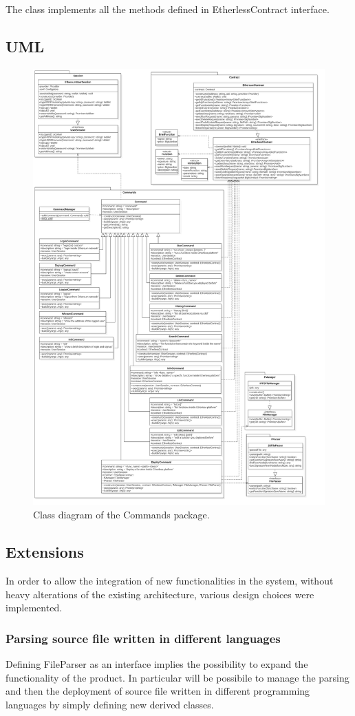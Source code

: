 					The class implements all the methods defined in EtherlessContract interface.
	
	\subsection{UML}
	\begin{figure} [H]
		\centering
		\includegraphics[width=0.85\linewidth]{diagrammi/etherless-cli/Classi}
		\caption{Class diagram of the Commands package.}
	\end{figure}
			
\subsection{Extensions}  
In order to allow the integration of new functionalities in the system, without heavy alterations of the existing architecture, various design choices were implemented.

\subsubsection{Parsing source file written in different languages}
Defining FileParser as an interface implies the possibility to expand the functionality of the product. In particular will be possibile to manage the parsing and then the deployment of source file written in different programming languages by simply defining new derived classes. 

